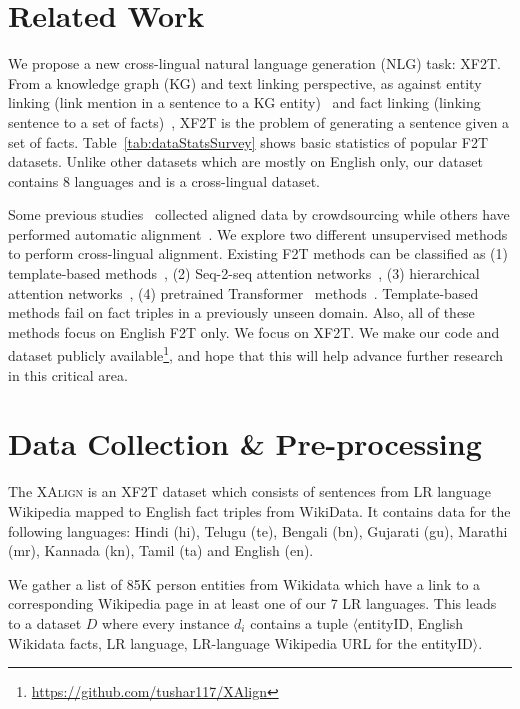 \documentclass[11pt]{article}
\def\langCount{8}
\def\lrLangCount{7}
\begin{document}
\section{Related Work}
\label{sec:related}

We propose a new cross-lingual natural language generation (NLG) task: XF2T. From a knowledge graph (KG) and text linking perspective, as against entity linking (link mention in a sentence to a KG entity)~\cite{botha2020entity} and fact linking (linking sentence to a set of facts)~\cite{kolluru2021multilingual}, XF2T is the problem of generating a sentence given a set of facts. Table~\ref{tab:dataStatsSurvey} shows basic statistics of popular F2T datasets. Unlike other datasets which are mostly on English only, our dataset contains \langCount{} languages and is a cross-lingual dataset. 

Some previous studies~\cite{gardent2017webnlg} collected aligned data by crowdsourcing while others have performed automatic alignment~\cite{agarwal2021knowledge}. We explore two different unsupervised methods to perform cross-lingual alignment. Existing F2T methods can be classified as (1) template-based  methods~\cite{cimiano2013exploiting,duma2013generating}, (2) Seq-2-seq attention networks~\cite{lebret2016wikibio,mei2016talk,shahidi2020two}, (3) hierarchical attention networks~\cite{nema2018generating,chen2020kgpt}, (4) pretrained Transformer~\cite{vaswani2017attention} methods~\cite{ribeiro2021investigating,zhao2020bridging,chen2020kgpt,fu2020partially}. Template-based methods fail on fact triples in a previously unseen domain. Also, all of these methods focus on English F2T only. We focus on XF2T. We make our code and dataset publicly available\footnote{\url{https://github.com/tushar117/XAlign}\label{datafootnote}}, and hope that this will help advance further research in this critical area.



\section{Data Collection \& Pre-processing}
\label{sec:cross_creation}
The \textsc{XAlign} is an XF2T dataset which consists of sentences from LR language Wikipedia mapped to English fact triples from WikiData. It contains data for the following languages: Hindi (hi), Telugu (te), Bengali (bn), Gujarati (gu), Marathi (mr), Kannada (kn), Tamil (ta) and English (en). 




We gather a list of 85K person entities from Wikidata which have a link to a corresponding Wikipedia page in at least one of our \lrLangCount{} LR languages. This leads to a dataset $D$ where every instance $d_i$ contains a tuple $\langle$entityID, English Wikidata facts, LR language, LR-language Wikipedia URL for the entityID$\rangle$.
\end{document}
